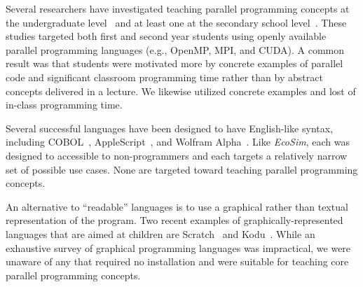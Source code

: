 \documentclass{sig-alternate}
\newcommand{\EcoSim}{\emph{EcoSim}}
\begin{document}
Several researchers have investigated teaching parallel programming concepts 
at the undergraduate level~\cite{freshmanParallel,undergraduateParallel,gridPortal} 
and at least one at the secondary school level~\cite{highSchoolParallel}.
These studies targeted both first and second year students
using openly available parallel programming languages (e.g., OpenMP, MPI, and CUDA).
A common result was that students were motivated more by 
concrete examples of parallel code and significant classroom programming time 
rather than by abstract concepts delivered in a lecture.
We likewise utilized concrete examples and lost of in-class programming time.


Several successful languages have been designed to have English-like syntax,
including COBOL~\cite{COBOL59}, AppleScript~\cite{AppleScript}, and Wolfram Alpha~\cite{WolframAlpha}.
Like \EcoSim{}, each was designed to accessible to non-programmers
and each targets a relatively narrow set of possible use cases.
None are targeted toward teaching parallel programming concepts.

An alternative to ``readable'' languages 
is to use a graphical rather than textual representation of the program.
Two recent examples of graphically-represented languages that are aimed at children 
are Scratch~\cite{Scratch} and Kodu~\cite{Kodu}.
While an exhaustive survey of graphical programming languages was impractical,
we were unaware of any that required no installation
and were suitable for teaching core parallel programming concepts.
\end{document}
